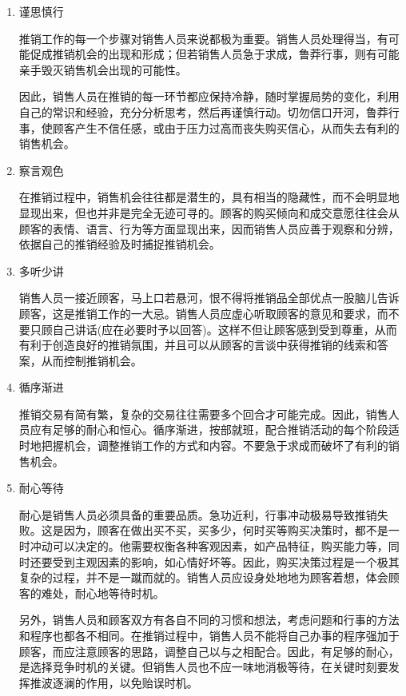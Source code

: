     \begin{enumerate}

    \item 谨思慎行

    推销工作的每一个步骤对销售人员来说都极为重要。销售人员处理得当，有可能促成推销机会的出现和形成；但若销售人员急于求成，鲁莽行事，则有可能亲手毁灭销售机会出现的可能性。

    因此，销售人员在推销的每一环节都应保持冷静，随时掌握局势的变化，利用自己的常识和经验，充分分析思考，然后再谨慎行动。切勿信口开河，鲁莽行事，使顾客产生不信任感，或由于压力过高而丧失购买信心，从而失去有利的销售机会。

    \item 察言观色

    在推销过程中，销售机会往往都是潜生的，具有相当的隐藏性，而不会明显地显现出来，但也并非是完全无迹可寻的。顾客的购买倾向和成交意愿往往会从顾客的表情、语言、行为等方面显现出来，因而销售人员应善于观察和分辨，依据自己的推销经验及时捕捉推销机会。

    \item 多听少讲

    销售人员一接近顾客，马上口若悬河，恨不得将推销品全部优点一股脑儿告诉顾客，这是推销工作的一大忌。销售人员应虚心听取顾客的意见和要求，而不要只顾自己讲话(应在必要时予以回答)。这样不但让顾客感到受到尊重，从而有利于创造良好的推销氛围，并且可以从顾客的言谈中获得推销的线索和答案，从而控制推销机会。

    \item 循序渐进

    推销交易有简有繁，复杂的交易往往需要多个回合才可能完成。因此，销售人员应有足够的耐心和恒心。循序渐进，按部就班，配合推销活动的每个阶段适时地把握机会，调整推销工作的方式和内容。不要急于求成而破坏了有利的销售机会。

    \item 耐心等待

    耐心是销售人员必须具备的重要品质。急功近利，行事冲动极易导致推销失败。这是因为，顾客在做出买不买，买多少，何时买等购买决策时，都不是一时冲动可以决定的。他需要权衡各种客观因素，如产品特征，购买能力等，同时还要受到主观因素的影响，如心情好坏等。因此，购买决策过程是一个极其复杂的过程，并不是一蹴而就的。销售人员应设身处地地为顾客着想，体会顾客的难处，耐心地等待时机。

    另外，销售人员和顾客双方有各自不同的习惯和想法，考虑问题和行事的方法和程序也都各不相同。在推销过程中，销售人员不能将自己办事的程序强加于顾客，而应注意顾客的思路，调整自己以与之相配合。因此，有足够的耐心，是选择竞争时机的关键。但销售人员也不应一味地消极等待，在关键时刻要发挥推波逐澜的作用，以免贻误时机。


\end{enumerate}
